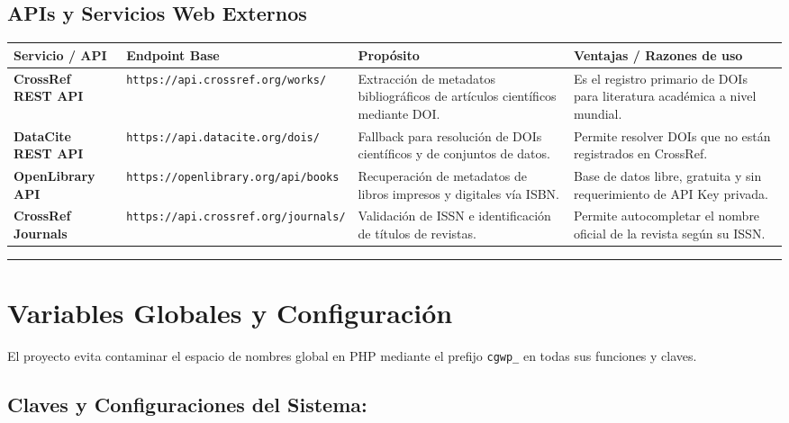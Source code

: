 \documentclass[11pt, a4paper]{article}
\begin{document}
\subsection{APIs y Servicios Web Externos}

\begin{longtable}{|p{4.0cm}|p{4.0cm}|p{4.0cm}|p{4.0cm}|}
\hline
\textbf{Servicio / API} & \textbf{Endpoint Base} & \textbf{Propósito} & \textbf{Ventajas / Razones de uso} \\
\hline
\endhead
\textbf{CrossRef REST API} & \texttt{https://api.crossref.org/works/} & Extracción de metadatos bibliográficos de artículos científicos mediante DOI. & Es el registro primario de DOIs para literatura académica a nivel mundial. \\
\hline
\textbf{DataCite REST API} & \texttt{https://api.datacite.org/dois/} & Fallback para resolución de DOIs científicos y de conjuntos de datos. & Permite resolver DOIs que no están registrados en CrossRef. \\
\hline
\textbf{OpenLibrary API} & \texttt{https://openlibrary.org/api/books} & Recuperación de metadatos de libros impresos y digitales vía ISBN. & Base de datos libre, gratuita y sin requerimiento de API Key privada. \\
\hline
\textbf{CrossRef Journals} & \texttt{https://api.crossref.org/journals/} & Validación de ISSN e identificación de títulos de revistas. & Permite autocompletar el nombre oficial de la revista según su ISSN. \\
\hline
\end{longtable}


\bigskip\noindent\rule{\textwidth}{0.4pt}\bigskip


\section{Variables Globales y Configuración}

El proyecto evita contaminar el espacio de nombres global en PHP mediante el prefijo \texttt{cgwp\_} en todas sus funciones y claves.


\subsection{Claves y Configuraciones del Sistema:}
\end{document}
